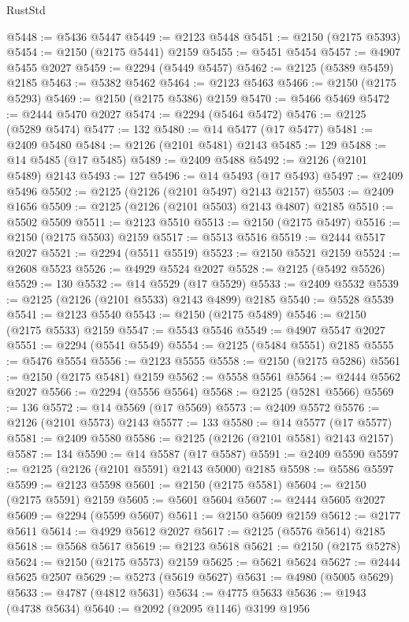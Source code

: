 \begin{lexlean}{RustStd}
\begin{coremodule}
@5448 := @5436 @5447
@5449 := @2123 @5448
@5451 := @2150 (@2175 @5393)
@5454 := @2150 (@2175 @5441) @2159
@5455 := @5451 @5454
@5457 := @4907 @5455 @2027
@5459 := @2294 (@5449 @5457)
@5462 := @2125 (@5389 @5459) @2185
@5463 := @5382 @5462
@5464 := @2123 @5463
@5466 := @2150 (@2175 @5293)
@5469 := @2150 (@2175 @5386) @2159
@5470 := @5466 @5469
@5472 := @2444 @5470 @2027
@5474 := @2294 (@5464 @5472)
@5476 := @2125 (@5289 @5474)
@5477 := 132
@5480 := @14 @5477 (@17 @5477)
@5481 := @2409 @5480
@5484 := @2126 (@2101 @5481) @2143
@5485 := 129
@5488 := @14 @5485 (@17 @5485)
@5489 := @2409 @5488
@5492 := @2126 (@2101 @5489) @2143
@5493 := 127
@5496 := @14 @5493 (@17 @5493)
@5497 := @2409 @5496
@5502 := @2125 (@2126 (@2101 @5497) @2143 @2157)
@5503 := @2409 @1656
@5509 := @2125 (@2126 (@2101 @5503) @2143 @4807) @2185
@5510 := @5502 @5509
@5511 := @2123 @5510
@5513 := @2150 (@2175 @5497)
@5516 := @2150 (@2175 @5503) @2159
@5517 := @5513 @5516
@5519 := @2444 @5517 @2027
@5521 := @2294 (@5511 @5519)
@5523 := @2150 @5521 @2159
@5524 := @2608 @5523
@5526 := @4929 @5524 @2027
@5528 := @2125 (@5492 @5526)
@5529 := 130
@5532 := @14 @5529 (@17 @5529)
@5533 := @2409 @5532
@5539 := @2125 (@2126 (@2101 @5533) @2143 @4899) @2185
@5540 := @5528 @5539
@5541 := @2123 @5540
@5543 := @2150 (@2175 @5489)
@5546 := @2150 (@2175 @5533) @2159
@5547 := @5543 @5546
@5549 := @4907 @5547 @2027
@5551 := @2294 (@5541 @5549)
@5554 := @2125 (@5484 @5551) @2185
@5555 := @5476 @5554
@5556 := @2123 @5555
@5558 := @2150 (@2175 @5286)
@5561 := @2150 (@2175 @5481) @2159
@5562 := @5558 @5561
@5564 := @2444 @5562 @2027
@5566 := @2294 (@5556 @5564)
@5568 := @2125 (@5281 @5566)
@5569 := 136
@5572 := @14 @5569 (@17 @5569)
@5573 := @2409 @5572
@5576 := @2126 (@2101 @5573) @2143
@5577 := 133
@5580 := @14 @5577 (@17 @5577)
@5581 := @2409 @5580
@5586 := @2125 (@2126 (@2101 @5581) @2143 @2157)
@5587 := 134
@5590 := @14 @5587 (@17 @5587)
@5591 := @2409 @5590
@5597 := @2125 (@2126 (@2101 @5591) @2143 @5000) @2185
@5598 := @5586 @5597
@5599 := @2123 @5598
@5601 := @2150 (@2175 @5581)
@5604 := @2150 (@2175 @5591) @2159
@5605 := @5601 @5604
@5607 := @2444 @5605 @2027
@5609 := @2294 (@5599 @5607)
@5611 := @2150 @5609 @2159
@5612 := @2177 @5611
@5614 := @4929 @5612 @2027
@5617 := @2125 (@5576 @5614) @2185
@5618 := @5568 @5617
@5619 := @2123 @5618
@5621 := @2150 (@2175 @5278)
@5624 := @2150 (@2175 @5573) @2159
@5625 := @5621 @5624
@5627 := @2444 @5625 @2507
@5629 := @5273 (@5619 @5627)
@5631 := @4980 (@5005 @5629)
@5633 := @4787 (@4812 @5631)
@5634 := @4775 @5633
@5636 := @1943 (@4738 @5634)
@5640 := @2092 (@2095 @1146) @3199 @1956

\end{coremodule}
\end{lexlean}
